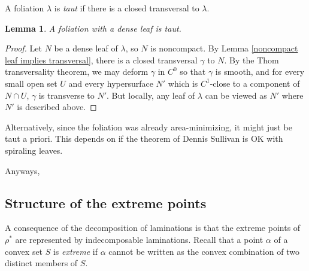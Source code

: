 \documentclass[reqno,11pt]{amsart}
\newcommand{\dfn}[1]{\emph{#1}\index{#1}}
\newtheorem{lemma}[theorem]{Lemma}
\theoremstyle{definition}
\numberwithin{equation}{section}
\begin{document}
A foliation $\lambda$ is \dfn{taut} if there is a closed transversal to $\lambda$.

\begin{lemma}
A foliation with a dense leaf is taut.
\end{lemma}
\begin{proof}
Let $N$ be a dense leaf of $\lambda$, so $N$ is noncompact.
By Lemma \ref{noncompact leaf implies transversal}, there is a closed transversal $\gamma$ to $N$.
By the Thom transversality theorem, we may deform $\gamma$ in $C^0$ so that $\gamma$ is smooth, and for every small open set $U$ and every hypersurface $N'$ which is $C^1$-close to a component of $N \cap U$, $\gamma$ is transverse to $N'$.
But locally, any leaf of $\lambda$ can be viewed as $N'$ where $N'$ is described above.
\end{proof}

Alternatively, since the foliation was already area-minimizing, it might just be taut a priori.
This depends on if the theorem of Dennis Sullivan is OK with spiraling leaves.

Anyways, 



\subsection{Structure of the extreme points}
A consequence of the decomposition of laminations is that the extreme points of $\rho^*$ are represented by indecomposable laminations.
Recall that a point $\alpha$ of a convex set $S$ is \dfn{extreme} if $\alpha$ cannot be written as the convex combination of two distinct members of $S$.
\end{document}
